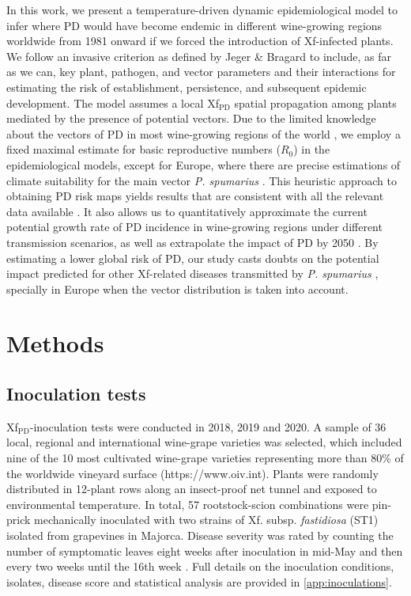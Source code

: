 In this work, we present a temperature-driven dynamic epidemiological model to
infer where PD would have become endemic in different wine-growing regions
worldwide from 1981 onward if we forced the introduction of Xf-infected plants.
We follow an invasive criterion as defined by Jeger \& Bragard \cite{Jeger2019}
to include, as far as we can, key plant, pathogen, and vector parameters and
their interactions for estimating the risk of establishment, persistence, and
subsequent epidemic development. The model assumes a local Xf$_{\textrm{PD}}$
spatial propagation among plants mediated by the presence of potential vectors.
Due to the limited knowledge about the vectors of PD in most wine-growing
regions of the world \cite{Redak2004}, we employ a fixed maximal estimate for
basic reproductive numbers ($R_0$) in the epidemiological models, except for
Europe, where there are precise estimations of climate suitability for the main
vector \textit{P. spumarius} \cite{Godefroid2021}. This heuristic approach to
obtaining PD risk maps yields results that are consistent with all the relevant
data available \cite{Bragard2019}. It also allows us to quantitatively
approximate the current potential growth rate of PD incidence in wine-growing
regions under different transmission scenarios, as well as extrapolate the
impact of PD by 2050 \cite{Webpage}. By estimating a lower global risk of PD,
our study casts doubts on the potential impact predicted for other Xf-related
diseases transmitted by \textit{P. spumarius} \cite{Schneider2020}, specially
in Europe when the vector distribution is taken into account.

\section{Methods}
\subsection{Inoculation tests}

Xf$_{\textrm{PD}}$-inoculation tests were
conducted in 2018, 2019 and 2020. A sample of 36 local, regional and
international wine-grape varieties was selected, which included nine of the
10 most cultivated wine-grape varieties representing more than 80\% of the
worldwide vineyard surface (https://www.oiv.int). Plants were randomly
distributed in 12-plant rows along an insect-proof net tunnel and exposed
to environmental temperature. In total, 57 rootstock-scion combinations were
pin-prick mechanically inoculated \cite{Almeida2003} with two strains of
Xf. subsp. \textit{fastidiosa} (ST1) isolated from grapevines in Majorca.
Disease severity was rated by counting the number of symptomatic leaves eight
weeks after inoculation in mid-May and then every two weeks until the 16th week
\cite{Moralejo2019}. Full details on the inoculation conditions, isolates,
disease score and statistical analysis are provided in \cref{app:inoculations}.


